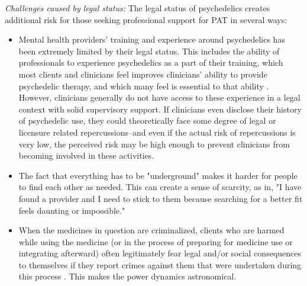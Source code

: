\documentclass[12pt,letterpaper]{book}
\begin{document}
\textit{Challenges caused by legal status:} The legal status of psychedelics creates additional risk for those seeking professional support for PAT in several ways:
\begin{itemize}
    \item Mental health providers' training and experience around psychedelics has been extremely limited by their legal status. This includes the ability of professionals to experience psychedelics as a part of their training, which most clients and clinicians feel improves clinicians' ability to provide psychedelic therapy, and which many feel is essential to that ability \cite{liknaitzkyProfessionalExperience}. However, clinicians generally do not have access to these experience in a legal context with solid supervisory support. If clinicians even disclose their history of psychedelic use, they could theoretically face some degree of legal or licensure related repercussions–and even if the actual risk of repercussions is very low, the perceived risk may be high enough to prevent clinicians from becoming involved in these activities.
    \item The fact that everything has to be "underground" makes it harder for people to find each other as needed.  This can create a sense of scarcity, as in, "I have found a provider and I need to stick to them because searching for a better fit feels daunting or impossible."
    \item When the medicines in question are criminalized, clients who are harmed while using the medicine (or in the process of preparing for medicine use or integrating afterward) often legitimately fear legal and/or social consequences to themselves if they report crimes against them that were undertaken during this process \cite{powerTrip}. This makes the power dynamics astronomical.
\end{itemize}
\end{document}
